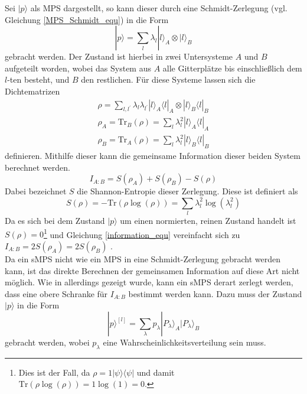 \documentclass[10pt,a4paper]{report}
\begin{document}
Sei $|p\rangle$ als MPS dargestellt, so kann dieser durch eine Schmidt-Zerlegung (vgl. Gleichung \ref{MPS_Schmidt_equ}) in die Form 
\begin{equation}
|p\rangle=\sum_{l}\lambda_{l}|l\rangle_A\otimes|l\rangle_B
\end{equation}
gebracht werden. Der Zustand ist hierbei in zwei Untersysteme $A$ und $B$ aufgeteilt worden, wobei das System aus $A$ alle Gitterplätze bis einschließlich dem $l$-ten besteht, und $B$ den restlichen. Für diese Systeme lassen sich die Dichtematrizen
\begin{equation}
\begin{split}
\rho=\sum_{l,l^{\prime}}\lambda_l\lambda_{l^{\prime}}|l\rangle_A\langle l|_A\otimes |l\rangle_B\langle l|_B\\
\rho_A=\text{Tr}_B(\rho)=\sum_{l}\lambda_l^2|l\rangle_A\langle l|_A\\
\rho_B=\text{Tr}_A(\rho)=\sum_{l}\lambda_l^2|l\rangle_B\langle l|_B
\end{split}
\end{equation}
definieren. Mithilfe dieser kann die gemeinsame Information dieser beiden System berechnet werden. 
\begin{equation}\label{information_equ}
I_{A:B}=S(\rho_A)+S(\rho_B)-S(\rho)
\end{equation}
Dabei bezeichnet $S$ die Shannon-Entropie dieser Zerlegung. Diese ist definiert als
\begin{equation}
S(\rho)=-\text{Tr}(\rho\log(\rho))=\sum_l\lambda_l^2\log(\lambda_l^2)
\end{equation} 
Da es sich bei dem Zustand $|p\rangle$ um einen normierten, reinen Zustand handelt ist $S(\rho)=0$\footnote{Dies ist der Fall, da $\rho=1|\psi\rangle\langle\psi|$ und damit $\text{Tr}(\rho\log(\rho))=1\log(1)=0$.} und Gleichung \ref{information_equ} vereinfacht sich zu $I_{A:B}=2S(\rho_A)=2S(\rho_B)$  \cite{Entropy}.\\


Da ein sMPS nicht wie ein MPS in eine Schmidt-Zerlegung gebracht werden kann, ist das direkte Berechnen der gemeinsamen Information auf diese Art nicht möglich. Wie in \cite{sMPS} allerdings gezeigt wurde, kann ein sMPS derart zerlegt werden, dass eine obere Schranke für $I_{A:B}$ bestimmt werden kann. Dazu muss der Zustand $|p\rangle$ in die Form
\begin{equation}
|p\rangle^{[l]}=\sum_{\lambda}p_{\lambda}|P_{\lambda}\rangle_A|P_{\lambda}\rangle_B
\end{equation}
gebracht werden, wobei $p_{\lambda}$ eine Wahrscheinlichkeitsverteilung sein muss.
\end{document}
